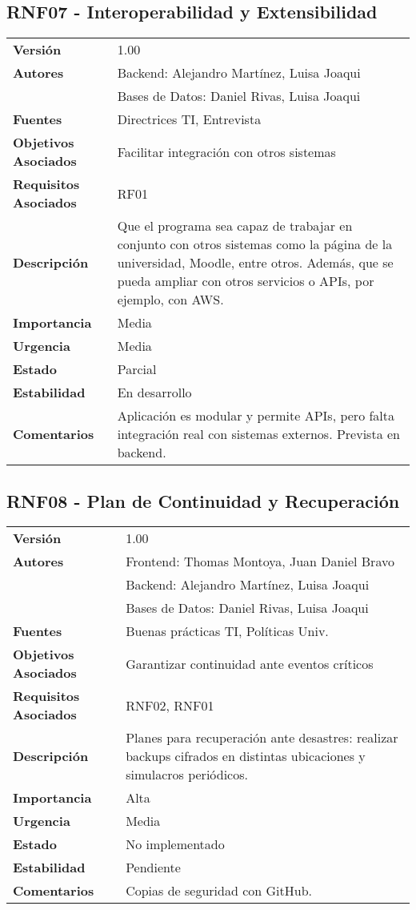 \documentclass{article}
\begin{document}
\subsection*{RNF07 - Interoperabilidad y Extensibilidad}
\begin{longtable}{>{\bfseries}l p{}}
Versión & 1.00 \\
Autores & Backend: Alejandro Martínez, Luisa Joaqui \\
        & Bases de Datos: Daniel Rivas, Luisa Joaqui \\
Fuentes & Directrices TI, Entrevista \\
Objetivos Asociados & Facilitar integración con otros sistemas \\
Requisitos Asociados & RF01 \\
Descripción & Que el programa sea capaz de trabajar en conjunto con otros sistemas como la página de la universidad, Moodle, entre otros. Además, que se pueda ampliar con otros servicios o APIs, por ejemplo, con AWS. \\
Importancia & Media \\
Urgencia & Media \\
Estado & Parcial \\
Estabilidad & En desarrollo \\
Comentarios & Aplicación es modular y permite APIs, pero falta integración real con sistemas externos. Prevista en backend. \\
\end{longtable}

\subsection*{RNF08 - Plan de Continuidad y Recuperación}
\begin{longtable}{>{\bfseries}l p{}}
Versión & 1.00 \\
Autores & Frontend: Thomas Montoya, Juan Daniel Bravo \\
        & Backend: Alejandro Martínez, Luisa Joaqui \\
        & Bases de Datos: Daniel Rivas, Luisa Joaqui \\
Fuentes & Buenas prácticas TI, Políticas Univ. \\
Objetivos Asociados & Garantizar continuidad ante eventos críticos \\
Requisitos Asociados & RNF02, RNF01 \\
Descripción & Planes para recuperación ante desastres: realizar backups cifrados en distintas ubicaciones y simulacros periódicos. \\
Importancia & Alta \\
Urgencia & Media \\
Estado & No implementado \\
Estabilidad & Pendiente \\
Comentarios & Copias de seguridad con GitHub. \\
\end{longtable}
\end{document}

